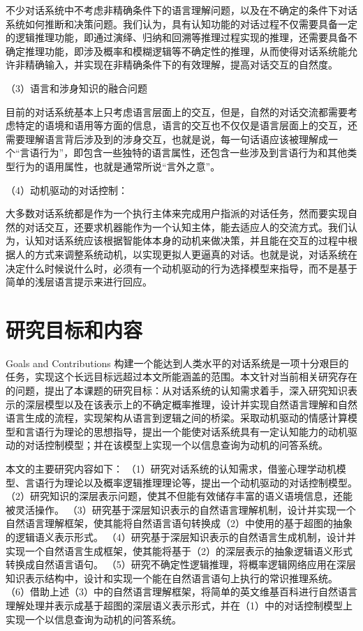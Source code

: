        不少对话系统中不考虑非精确条件下的语言理解问题，以及在不确定的条件下对话系统如何推断和决策问题。我们认为，具有认知功能的对话过程不仅需要具备一定的逻辑推理功能，即通过演绎、归纳和回溯等推理过程实现的推理，还需要具备不确定推理功能，即涉及概率和模糊逻辑等不确定性的推理，从而使得对话系统能允许非精确输入，并实现在非精确条件下的有效理解，提高对话交互的自然度。

（3）语言和涉身知识的融合问题

       目前的对话系统基本上只考虑语言层面上的交互，但是，自然的对话交流都需要考虑特定的语境和语用等方面的信息，语言的交互也不仅仅是语言层面上的交互，还需要理解语言背后涉及到的涉身交互，也就是说，每一句话语应该被理解成一个“言语行为”，即包含一些独特的语言属性，还包含一些涉及到言语行为和其他类型行为的语用属性，也就是通常所说“言外之意”。

（4）动机驱动的对话控制：

     大多数对话系统都是作为一个执行主体来完成用户指派的对话任务，然而要实现自然的对话交互，还要求机器能作为一个认知主体，能去适应人的交流方式。我们认为，认知对话系统应该根据智能体本身的动机来做决策，并且能在交互的过程中根据人的方式来调整系统动机，以实现更拟人更逼真的对话。也就是说，对话系统在决定什么时候说什么时，必须有一个动机驱动的行为选择模型来指导，而不是基于简单的浅层语言提示来进行回应。


\section{研究目标和内容}{Goals and Contributions}
      构建一个能达到人类水平的对话系统是一项十分艰巨的任务，实现这个长远目标远超过本文所能涵盖的范围。本文针对当前相关研究存在的问题，提出了本课题的研究目标：从对话系统的认知需求着手，深入研究知识表示的深层模型以及在该表示上的不确定概率推理，设计并实现自然语言理解和自然语言生成的流程，实现架构从语言到逻辑之间的桥梁。采取动机驱动的情感计算模型和言语行为理论的思想指导，提出一个能使对话系统具有一定认知能力的动机驱动的对话控制模型；并在该模型上实现一个以信息查询为动机的问答系统。

       本文的主要研究内容如下：
（1）研究对话系统的认知需求，借鉴心理学动机模型、言语行为理论以及概率逻辑推理理论等，提出一个动机驱动的对话控制模型。
（2）研究知识的深层表示问题，使其不但能有效储存丰富的语义语境信息，还能被灵活操作。
（3）研究基于深层知识表示的自然语言理解机制，设计并实现一个自然语言理解框架，使其能将自然语言语句转换成（2）中使用的基于超图的抽象的逻辑语义表示形式。
（4）研究基于深层知识表示的自然语言生成机制，设计并实现一个自然语言生成框架，使其能将基于（2）的深层表示的抽象逻辑语义形式转换成自然语言语句。
（5）研究不确定性逻辑推理，将概率逻辑网络应用在深层知识表示结构中，设计和实现一个能在自然语言语句上执行的常识推理系统。
（6）借助上述（3）中的自然语言理解框架，将简单的英文维基百科进行自然语言理解处理并表示成基于超图的深层语义表示形式，并在（1）中的对话控制模型上实现一个以信息查询为动机的问答系统。

